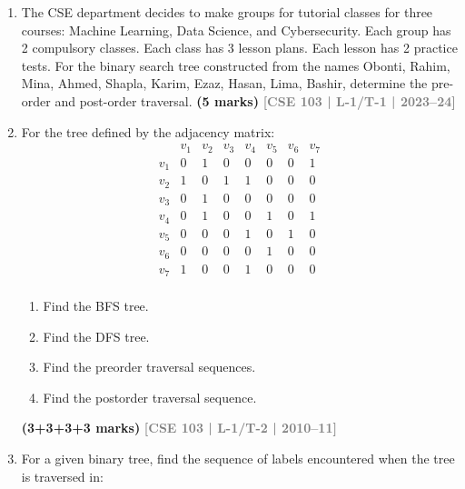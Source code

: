 \documentclass[12pt,a3paper]{article}
\newcommand{\yr}[1]{\hfill\textcolor{gray}{\small\textbf{[#1]}}}
\newcommand{\mk}[1]{\textcolor{orange!70!black}{\small\textbf{(#1 marks)}}}
\begin{document}
\begin{enumerate}


\item The CSE department decides to make groups for tutorial classes for three courses: Machine Learning, Data Science, and Cybersecurity. Each group has 2 compulsory classes. Each class has 3 lesson plans. Each lesson has 2 practice tests.
For the binary search tree constructed from the names Obonti, Rahim, Mina, Ahmed, Shapla, Karim, Ezaz, Hasan, Lima, Bashir, determine the pre-order and post-order traversal.
\mk{5} \yr{CSE 103 | L-1/T-1 | 2023--24}

\item 

For the tree defined by the adjacency matrix:
\[
\begin{array}{c|ccccccc}
  & v_1 & v_2 & v_3 & v_4 & v_5 & v_6 & v_7 \\\hline
v_1 & 0 & 1 & 0 & 0 & 0 & 0 & 1 \\
v_2 & 1 & 0 & 1 & 1 & 0 & 0 & 0 \\
v_3 & 0 & 1 & 0 & 0 & 0 & 0 & 0 \\
v_4 & 0 & 1 & 0 & 0 & 1 & 0 & 1 \\
v_5 & 0 & 0 & 0 & 1 & 0 & 1 & 0 \\
v_6 & 0 & 0 & 0 & 0 & 1 & 0 & 0 \\
v_7 & 1 & 0 & 0 & 1 & 0 & 0 & 0 \\
\end{array}
\]
\begin{enumerate}
  \item Find the BFS tree.
  \item Find the DFS tree.
  \item Find the preorder traversal sequences.
  \item Find the postorder traversal sequence.
\end{enumerate}
\mk{3+3+3+3} \yr{CSE 103 | L-1/T-2 | 2010--11}


\item For a given binary tree, find the sequence of labels encountered when the tree is traversed in:
\begin{center}
\end{center}
\end{enumerate}
\end{document}

